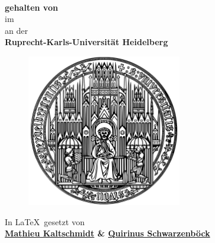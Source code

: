 
\begin{titlepage}
	\begin{center}
		\makeatletter
		
		\thispagestyle{empty}
		
		\Huge\textbf{\@title} \\
		\vspace{5mm}
		\Large\textbf{ gehalten von \@author} \\
		\large{im \@date} \\
		\vspace{5mm}
		\large{an der} \\
		\Large\textbf{Ruprecht-Karls-Universität Heidelberg} \\
		\vfill
		\begin{figure}[H]
			\centering
			\includegraphics*[width=0.6\textwidth]{figures/logo-uni-hd-small}
		\end{figure}
	    \vfill
		\Large
		In \LaTeX \ gesetzt von \\ 
		\vspace{3mm}
		\bfseries{
		\href{mailto:M.Kaltschmidt@stud.uni-heidelberg.de}{Mathieu Kaltschmidt} 
		\& 
		\href{mailto:quirin.s@icloud.com}{Quirinus Schwarzenböck}}\\ 	
		\makeatother
	\end{center}
\blankpage
\end{titlepage}

